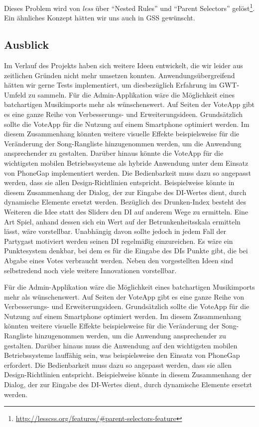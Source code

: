 Dieses Problem wird von \textit{less} über "`Nested Rules"' und "`Parent Selectors"' gelöst\footnote{\url{http://lesscss.org/features/\#parent-selectors-feature}}. Ein ähnliches Konzept
hätten wir uns auch in GSS gewünscht.

\subsection{Ausblick}
Im Verlauf des Projekts haben sich weitere Ideen entwickelt, die wir leider aus zeitlichen Gründen nicht mehr umsetzen konnten. Anwendungsübergreifend hätten wir gerne Tests implementiert, um diesbezüglich Erfahrung im GWT-Umfeld zu sammeln. Für die Admin-Applikation wäre die Möglichkeit eines batchartigen Musikimports mehr als wünschenswert. Auf Seiten der VoteApp gibt es eine ganze Reihe von Verbesserungs- und Erweiterungsideen. Grundsätzlich sollte die VoteApp für die Nutzung auf einem Smartphone optimiert werden. Im diesem Zusammenhang könnten weitere visuelle Effekte beispielsweise für die Veränderung der Song-Rangliste hinzugenommen werden, um die Anwendung ansprechender zu gestalten. Darüber hinaus könnte die VoteApp für die wichtigsten mobilen Betriebssysteme als hybride Anwendung unter dem Einsatz von PhoneGap implementiert werden. Die Bedienbarkeit muss dazu so angepasst werden, dass sie allen Design-Richtlinien entspricht. Beispielweise könnte in diesem Zusammenhang der Dialog, der zur Eingabe des DI-Wertes dient, durch dynamische Elemente ersetzt werden. Bezüglich des Drunken-Index besteht des Weiteren die Idee statt des Sliders den DI auf anderem Wege zu ermitteln. Eine Art Spiel, anhand dessen sich ein Wert auf der Betrunkenheitsskala ermitteln lässt, wäre vorstellbar. Unabhängig davon sollte jedoch in jedem Fall der Partygast motiviert werden seinen DI regelmäßig einzureichen. Es wäre ein Punktesystem denkbar, bei dem es für die Eingabe des DIs Punkte gibt, die bei Abgabe eines Votes verbraucht werden. Neben den vorgestellten Ideen sind selbstredend noch viele weitere Innovationen vorstellbar.

Für die Admin-Applikation wäre die Möglichkeit eines batchartigen Musikimports mehr als wünschenswert. Auf Seiten der VoteApp gibt es eine ganze Reihe von Verbesserungs- und Erweiterungsideen. Grundsätzlich sollte die VoteApp für die Nutzung auf einem Smartphone optimiert werden. Im diesem Zusammenhang könnten weitere visuelle Effekte beispielsweise für die Veränderung der Song-Rangliste hinzugenommen werden, um die Anwendung ansprechender zu gestalten. Darüber hinaus muss die Anwendung auf den wichtigsten mobilen Betriebssysteme lauffähig sein, was beispielsweise den Einsatz von PhoneGap erfordert. Die Bedienbarkeit muss dazu so angepasst werden, dass sie allen Design-Richtlinien entspricht. Beispielweise könnte in diesem Zusammenhang der Dialog, der zur Eingabe des DI-Wertes dient, durch dynamische Elemente ersetzt werden. 

